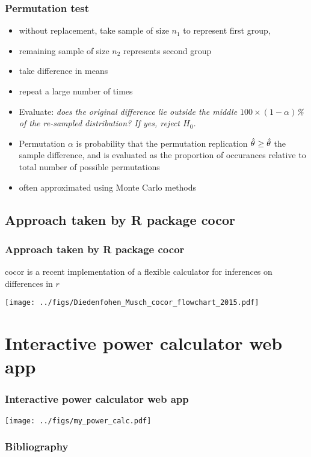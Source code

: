 \documentclass{beamer}
\begin{document}
  \begin{frame}
    \frametitle{Permutation test }  
    \begin{itemize}
  		\item without replacement, take sample of size \(n_1\) to represent first group, 
  		\item remaining sample of size \(n_2\) represents second group
	  	\item take difference in means
		  \item repeat a large number of times
		  \item Evaluate: \it{does the original difference lie outside the middle \(100\times(1-\alpha)\)\%  of the re-sampled distribution?} If yes, reject \(H_0\). 
  		\item Permutation \(\alpha\) is probability that the permutation replication \(\hat{\theta}^{\*} \geq \hat{\theta}\) the sample difference, and is evaluated as the proportion of occurances relative to total number of possible permutations
		\item often approximated using Monte Carlo methods
    \end{itemize}
  \end{frame}  

  \subsection{Approach taken by R package cocor} 
  \begin{frame}
    \frametitle{Approach taken by R package cocor}
    cocor  is a recent implementation of a flexible calculator for inferences on differences in \(r\)
    \begin{center}
      \texttt{[image: ../figs/Diedenfohen\_Musch\_cocor\_flowchart\_2015.pdf]}
    \end{center}
  \end{frame}  

  \section{Interactive power calculator web app} 
  \begin{frame}
    \frametitle{Interactive power calculator web app}
    \begin{center}
      \texttt{[image: ../figs/my\_power\_calc.pdf]}
    \end{center}
  \end{frame}    
  
  \begin{frame}[allowframebreaks]
    \frametitle{Bibliography}
    \printbibliography
  \end{frame}
  
\end{document}
